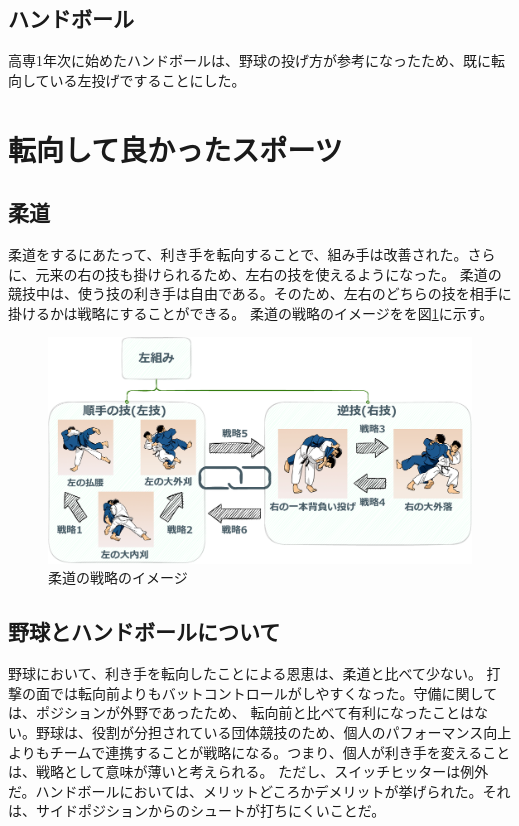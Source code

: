 \documentclass[a4paper,10pt,twocolumn]{jsarticle}
\begin{document}
\subsection{ハンドボール}
高専1年次に始めたハンドボールは、野球の投げ方が参考になったため、既に転向している左投げですることにした。
\section{転向して良かったスポーツ}
\subsection{柔道}
柔道をするにあたって、利き手を転向することで、組み手は改善された。さらに、元来の右の技も掛けられるため、左右の技を使えるようになった。
柔道の競技中は、使う技の利き手は自由である。そのため、左右のどちらの技を相手に掛けるかは戦略にすることができる。
柔道の戦略のイメージをを図\ref{judo}に示す。
\begin{figure}[h]
    \centering
    \includegraphics[scale=0.34]{img/judo.pdf}
    \caption{柔道の戦略のイメージ\cite{judo}}
    \label{judo}
\end{figure}

\subsection{野球とハンドボールについて}
野球において、利き手を転向したことによる恩恵は、柔道と比べて少ない。
打撃の面では転向前よりもバットコントロールがしやすくなった。守備に関しては、ポジションが外野であったため、
転向前と比べて有利になったことはない。野球は、役割が分担されている団体競技のため、個人のパフォーマンス向上よりもチームで連携することが戦略になる。つまり、個人が利き手を変えることは、戦略として意味が薄いと考えられる。
ただし、スイッチヒッターは例外だ。ハンドボールにおいては、メリットどころかデメリットが挙げられた。それは、サイドポジションからのシュートが打ちにくいことだ。
\end{document}
